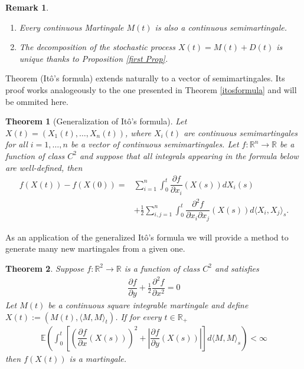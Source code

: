 \documentclass[11pt,a4paper, final]{article}
\newtheorem{thm}{Theorem}[section]
\newtheorem{rem}{Remark}[defn]
\begin{document}
\begin{rem}  \ 
\begin{enumerate} 
\item Every continuous Martingale $M(t)$ is also a continuous semimartingale. 
\item The decomposition of the stochastic process $X(t)=M(t) + D(t)$ is unique thanks to Proposition \ref{first Prop}. 
\end{enumerate} 
\end{rem}
\noindent Theorem (Itô's formula) extends naturally to a vector of semimartingales. Its proof works analogeously to the one presented in Theorem \ref{itosformula} and will be ommited here.
\begin{thm}[Generalization of Itô's formula] Let $X(t) = (X_1(t), \dots , X_n(t))$, where $X_i(t)$ are continuous semimartingales for all $i=1, \dots ,n$ be a vector of continuous semimartingales. Let $f: \mathbb{R}^n \to \mathbb{R}$ be a function of class $C^2$ and suppose that all integrals appearing in the formula below are well-defined, then 
\begin{align*}
f(X(t))-f(X(0)) = & \sum_{i=1}^n \int_0^t \dfrac{\partial f}{\partial x_i} (X(s)) dX_i(s)
\\ & + \frac{1}{2} \sum_{i,j=1}^n \int_0^t \dfrac{\partial^2 f	}{\partial x_i \partial x_j}(X(s))d \langle X_i, X_j \rangle_s. 
\end{align*}
\end{thm}
\noindent As an application of the generalized Itô's formula we will provide a method to generate many new martingales from a given one. 
\newpage
\begin{thm} \label{fromitotomartingale} Suppose $f: \mathbb{R}^2 \to \mathbb{R}$ is a function of class $C^2$ and satisfies \begin{align*}
\dfrac{\partial f}{\partial y} + \frac{1}{2} \dfrac{\partial^2 f}{\partial x^2}= 0 
\end{align*}
Let $M(t)$ be a continuous square integrable martingale and define $X(t):=(M(t), \langle M, M \rangle_t )$. If for every $t \in \mathbb{R}_+$ 
\begin{align*}
\mathbb{E} \left( \int_0^t \left[ \left( \dfrac{\partial f}{\partial x}(X(s)) \right)^2 + \left| \dfrac{\partial f}{\partial y} (X(s)) \right| \right] d \langle M, M \rangle_s \right) < \infty \tag{$\diamondsuit$}
\end{align*}
then $f(X(t))$ is a martingale. 
\end{thm}
\end{document}
